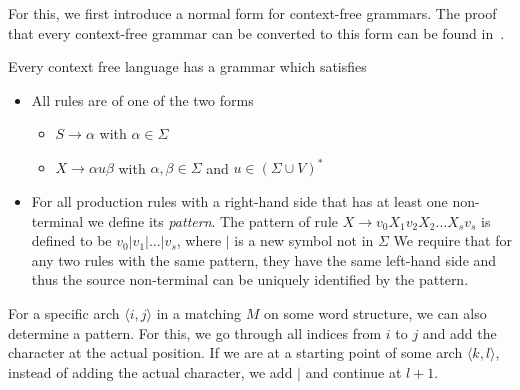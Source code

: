 For this, we first introduce a normal form for context-free grammars.
The proof that every context-free grammar can be converted to this form can be found in~\cite{Lautemann1995}.
\begin{lemma}
    Every context free language has a grammar which satisfies
    \begin{itemize}
        \setlength\itemsep{0.15em}
        \item All rules are of one of the two forms
        \begin{itemize}
            \setlength\itemsep{0.15em}
            \item $S \to \alpha$ with $\alpha \in \Sigma$
            \item $X \to \alpha u \beta$ with $\alpha, \beta \in \Sigma$ and $u \in (\Sigma \cup V)^{*}$
        \end{itemize}
        \item For all production rules with a right-hand side that has at least one non-terminal we define its \emph{pattern}.
        The pattern of rule $X \to v_{0}X_{1}v_{2}X_{2}\dots X_{s}v_{s}$ is defined to be $v_{0}|v_{1}|\dots|v_{s}$, where $|$ is a new symbol not in $\Sigma$
        We require that for any two rules with the same pattern, they have the same left-hand side and thus the source non-terminal can be uniquely identified by the pattern.
    \end{itemize}
\end{lemma}

For a specific arch $\langle i, j \rangle$ in a matching $M$ on some word structure, we can also determine a pattern.
For this, we go through all indices from $i$ to $j$ and add the character at the actual position.
If we are at a starting point of some arch $\langle k, l \rangle$, instead of adding the actual character, we add $|$ and continue at $l + 1$.


